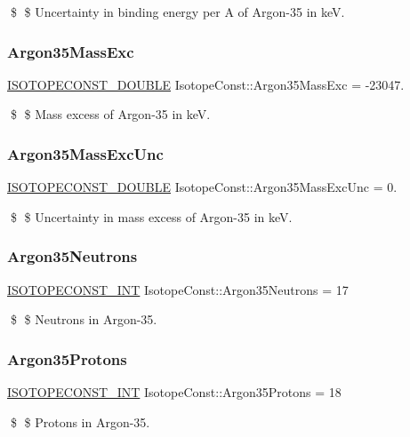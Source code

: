 \$ \$ Uncertainty in binding energy per A of Argon-\/35 in keV. \mbox{\label{group___isotope_const-_argon-_ar35_gace543f79bb2b0c4eccd26ad1d855574a}} 
\subsubsection{\texorpdfstring{Argon35\+Mass\+Exc}{Argon35MassExc}}
{\footnotesize\ttfamily \mbox{\hyperlink{group___isotope_const-_macros_ga8f45a7272ce02c0b4c65c44636ed719a}{I\+S\+O\+T\+O\+P\+E\+C\+O\+N\+S\+T\+\_\+\+D\+O\+U\+B\+LE}} Isotope\+Const\+::\+Argon35\+Mass\+Exc = -\/23047.}

\$ \$ Mass excess of Argon-\/35 in keV. \mbox{\label{group___isotope_const-_argon-_ar35_gacb81df299ee4c6d84381128264bee0cf}} 
\subsubsection{\texorpdfstring{Argon35\+Mass\+Exc\+Unc}{Argon35MassExcUnc}}
{\footnotesize\ttfamily \mbox{\hyperlink{group___isotope_const-_macros_ga8f45a7272ce02c0b4c65c44636ed719a}{I\+S\+O\+T\+O\+P\+E\+C\+O\+N\+S\+T\+\_\+\+D\+O\+U\+B\+LE}} Isotope\+Const\+::\+Argon35\+Mass\+Exc\+Unc = 0.}

\$ \$ Uncertainty in mass excess of Argon-\/35 in keV. \mbox{\label{group___isotope_const-_argon-_ar35_ga127775dcbf46db21897f12e69008d722}} 
\subsubsection{\texorpdfstring{Argon35\+Neutrons}{Argon35Neutrons}}
{\footnotesize\ttfamily \mbox{\hyperlink{group___isotope_const-_macros_ga5f18360b3e99483a35c32d789e62621c}{I\+S\+O\+T\+O\+P\+E\+C\+O\+N\+S\+T\+\_\+\+I\+NT}} Isotope\+Const\+::\+Argon35\+Neutrons = 17}

\$ \$ Neutrons in Argon-\/35. \mbox{\label{group___isotope_const-_argon-_ar35_ga092da137c5046945dbfc8b7a53fd802b}} 
\subsubsection{\texorpdfstring{Argon35\+Protons}{Argon35Protons}}
{\footnotesize\ttfamily \mbox{\hyperlink{group___isotope_const-_macros_ga5f18360b3e99483a35c32d789e62621c}{I\+S\+O\+T\+O\+P\+E\+C\+O\+N\+S\+T\+\_\+\+I\+NT}} Isotope\+Const\+::\+Argon35\+Protons = 18}

\$ \$ Protons in Argon-\/35. 